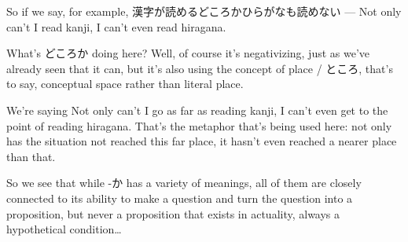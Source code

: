 So if we say, for example, 漢字が読めるどころかひらがなも読めない --- Not only can't I read kanji, I can't even read hiragana.

{}

What's どころか doing here? Well, of course it's negativizing, just as we've already seen that it can, but it's also using the concept of place / ところ, that's to say, conceptual space rather than literal place.

We're saying Not only can't I go as far as reading kanji, I can't even get to the point of reading hiragana. That's the metaphor that's being used here: not only has the situation not reached this far place, it hasn't even reached a nearer place than that.

So we see that while -か has a variety of meanings, all of them are closely connected to its ability to make a question and turn the question into a proposition, but never a proposition that exists in actuality, always a hypothetical condition\ldots{}

\stopsectionlevel

\stopsectionlevel
